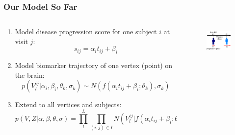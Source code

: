 \begin{frame}
\frametitle{Our Model So Far}

\begin{columns}[T]
    \begin{column}{.7\textwidth} %
   
     
   \begin{enumerate}      
      
      \item Model disease progression score for one subject $i$ at visit $j$:
      $$s_{ij} = \alpha_i t_{ij} + \beta_i$$
      
      \vspace{1em}
      
      \item Model biomarker trajectory of one vertex (point) on the brain:
      $$p(V_l^{ij} | \alpha_i, \beta_i, \theta_k, \sigma_k) \sim N(f(\alpha_i t_{ij} + \beta_i ; \theta_k), \sigma_k)$$
      
      \vspace{1em}
      
      \item Extend to all vertices and subjects:
  $$  p(V, Z | \alpha, \beta, \theta, \sigma) = \prod_l^L \prod_{(i,j) \in I} N(V_l^{ij} | f(\alpha_i t_{ij} + \beta_i ; \theta_{Z_l}), \sigma_{Z_l}) $$

      \vspace{1em}
  
     
     \end{enumerate}
     

    \end{column}
    \begin{column}{.3\textwidth}

    \vspace{-2em}
    
    \begin{figure}
    \centering
    \includegraphics[height=1.5cm]{disease_axis.png}
    \end{figure}
    

\end{column}
\end{columns}
\end{frame}
